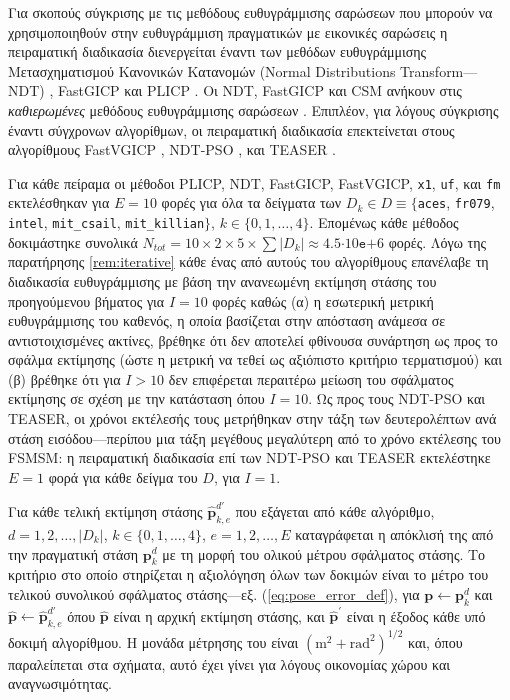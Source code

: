 Για σκοπούς σύγκρισης με τις μεθόδους ευθυγράμμισης σαρώσεων που μπορούν να
χρησιμοποιηθούν στην ευθυγράμμιση πραγματικών με εικονικές σαρώσεις η
πειραματική διαδικασία διενεργείται έναντι των μεθόδων ευθυγράμμισης
Μετασχηματισμού Κανονικών Κατανομών (Normal Distributions Transform---NDT)
\cite{Bibera,ndt_code}, FastGICP \cite{Segal2009a,fgicp_code} και PLICP
\cite{Censi2008a,plicp_code}. Οι NDT, FastGICP και CSM ανήκουν στις
\textit{καθιερωμένες} μεθόδους ευθυγράμμισης σαρώσεων
\cite{Koide2021a,Xu2018b,Sobreira2019b,Pishehvari2019b,Qingshan2019c,Pham2021b}.
Επιπλέον, για λόγους σύγκρισης έναντι σύγχρονων αλγορίθμων, οι πειραματική
διαδικασία επεκτείνεται στους αλγορίθμους FastVGICP
\cite{Koide2021a,fgicp_code}, NDT-PSO \cite{Bouraine2021,ndt_pso_code}, και
TEASER \cite{Yang2021,teaser_code}.

Για κάθε πείραμα οι μέθοδοι PLICP, NDT, FastGICP, FastVGICP, \texttt{x1},
\texttt{uf}, και \texttt{fm} εκτελέσθηκαν για $E = 10$ φορές για όλα τα
δείγματα των $D_k \in D \equiv \{$\texttt{aces}, \texttt{fr079},
\texttt{intel}, \texttt{mit\_csail}, \texttt{mit\_killian}$\}$, $k \in
\{0,1,\dots,4\}$.  Επομένως κάθε μέθοδος δοκιμάστηκε συνολικά $N_{tot} = 10
\times 2 \times 5 \times \sum |D_k|\approx 4.5$$\cdot10$$\texttt{e}$$+$$6$
φορές. Λόγω της παρατήρησης \ref{rem:iterative} κάθε ένας από αυτούς του
αλγορίθμους επανέλαβε τη διαδικασία ευθυγράμμισης με βάση την ανανεωμένη
εκτίμηση στάσης του προηγούμενου βήματος για $I = 10$ φορές καθώς (α) η
εσωτερική μετρική ευθυγράμμισης του καθενός, η οποία βασίζεται στην απόσταση
ανάμεσα σε αντιστοιχισμένες ακτίνες, βρέθηκε ότι δεν αποτελεί φθίνουσα
συνάρτηση ως προς το σφάλμα εκτίμησης (ώστε η μετρική να τεθεί ως αξιόπιστο
κριτήριο τερματισμού) και (β) βρέθηκε ότι για $I > 10$ δεν επιφέρεται περαιτέρω
μείωση του σφάλματος εκτίμησης σε σχέση με την κατάσταση όπου $I=10$.  Ως προς
τους NDT-PSO και TEASER, οι χρόνοι εκτέλεσής τους μετρήθηκαν στην τάξη των
δευτερολέπτων ανά στάση εισόδου---περίπου μια τάξη μεγέθους μεγαλύτερη από το
χρόνο εκτέλεσης του FSMSM: η πειραματική διαδικασία επί των NDT-PSO και TEASER
εκτελέστηκε $E=1$ φορά για κάθε δείγμα του $D$, για $I=1$.

Για κάθε τελική εκτίμηση στάσης $\hat{\bm{p}}_{k,e}^{d\prime}$ που εξάγεται από
κάθε αλγόριθμο, $d = 1,2,\dots,|D_k|$, $k \in \{0,1,\dots,4\}$, $e=1,2,\dots,E$
καταγράφεται η απόκλισή της από την πραγματική στάση $\bm{p}_k^d$ με τη μορφή
του ολικού μέτρου σφάλματος στάσης. Το κριτήριο στο οποίο στηρίζεται η
αξιολόγηση όλων των δοκιμών είναι το μέτρο του τελικού συνολικού σφάλματος
στάσης---εξ. (\ref{eq:pose_error_def}), για $\bm{p} \leftarrow \bm{p}^d_k$ και
$\hat{\bm{p}} \leftarrow \hat{\bm{p}}^{d\prime}_{k,e}$ όπου $\hat{\bm{p}}$
είναι η αρχική εκτίμηση στάσης, και $\hat{\bm{p}}^\prime$ είναι η έξοδος κάθε
υπό δοκιμή αλγορίθμου. Η μονάδα μέτρησης του είναι
$(\text{m}^2+\text{rad}^2)^{1/2}$ και, όπου παραλείπεται στα σχήματα, αυτό έχει
γίνει για λόγους οικονομίας χώρου και αναγνωσιμότητας.

